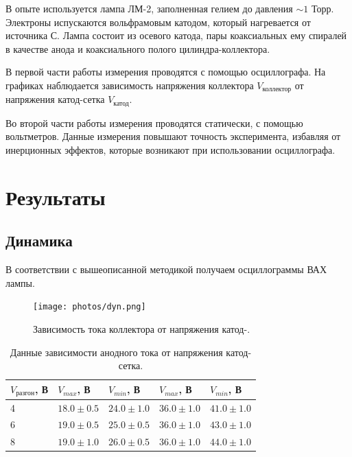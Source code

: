 \documentclass[12pt,a4paper]{article}
\begin{document}
	В опыте используется лампа ЛМ-2, заполненная гелием до давления $\sim 1$ Торр. Электроны испускаются вольфрамовым катодом, который нагревается от источника С. Лампа состоит из осевого катода, пары коаксиальных ему спиралей в качестве анода и коаксиального полого цилиндра-коллектора.
		
	В первой части работы измерения проводятся с помощью осциллографа. На графиках наблюдается зависимость напряжения коллектора $V_{\text{коллектор}}$ от напряжения катод-сетка $V_{\text{катод}}$.
	
	Во второй части работы измерения проводятся статически, с помощью вольтметров. Данные измерения повышают точность эксперимента, избавляя от инерционных эффектов, которые возникают при использовании осциллографа.

	\newpage

	\section*{Результаты}
	
	\subsection*{Динамика}
	
	В соответствии с вышеописанной методикой получаем осциллограммы ВАХ лампы.

	\begin{figure}[H]
		\centering
		\texttt{[image: photos/dyn.png]}
		\caption{Зависимость тока коллектора от напряжения катод-.}
		\label{fig:dyn}
	\end{figure}
	
	\begin{table}[H]
		\footnotesize
		\begin{tabular}{lllll}
			\hline
			$V_{\text{разгон}}$, В & $V_{max}$, В   & $V_{min}$, В   & $V_{max}$, В   & $V_{min}$, В   \\ \hline
			4                      & $18.0 \pm 0.5$ & $24.0 \pm 1.0$ & $36.0 \pm 1.0$ & $41.0 \pm 1.0$ \\
			6                      & $19.0 \pm 0.5$ & $25.0 \pm 0.5$ & $36.0 \pm 1.0$ & $43.0 \pm 1.0$ \\
			8                      & $19.0 \pm 1.0$ & $26.0 \pm 0.5$ & $36.0 \pm 1.0$ & $44.0 \pm 1.0$ \\ \hline
		\end{tabular}
		\caption{Данные зависимости анодного тока от напряжения катод-сетка.}
		\label{tab:dyn}
	\end{table}
	
\end{document}
